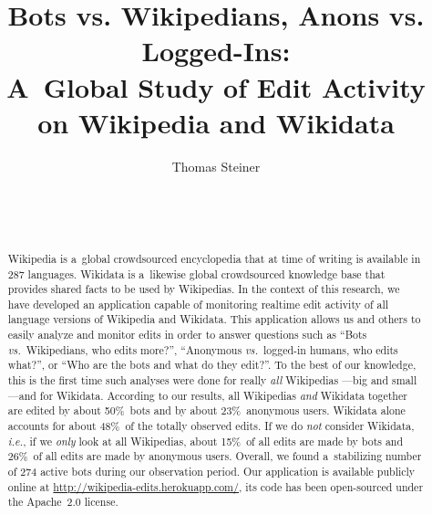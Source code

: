 \documentclass{sig-alternate}
\newcommand{\inlinelistingsize}{\fontsize{8pt}{11pt}}
\let\oldurl\url
\renewcommand{\url}[1]{\inlinelistingsize\oldurl{#1}}
\begin{document}
%

\title{Bots vs. Wikipedians, Anons vs. Logged-Ins:\\ A~Global Study of Edit Activity on Wikipedia and Wikidata}


\author{
\alignauthor
Thomas Steiner\\
       \\
       \\
       \\
}

\maketitle
\begin{abstract}
Wikipedia is a~global crowdsourced encyclopedia
that at time of writing is available in 287 languages.
Wikidata is a~likewise global crowdsourced knowledge base
that provides shared facts to be used by Wikipedias.
In the context of this research, we have developed
an application capable of monitoring
realtime edit activity of all language versions
of Wikipedia and Wikidata.
This application allows us and others to easily analyze and monitor edits
in order to answer questions such as
``Bots \emph{vs.}\ Wikipedians, who edits more?'',
``Anonymous \emph{vs.}\ logged-in humans, who edits what?'',
or ``Who are the bots and what do they edit?''.
To the best of our knowledge,
this is the first time such analyses
were done for really \emph{all} Wikipedias%
---big and small---and for Wikidata.
According to our results, all Wikipedias \emph{and} Wikidata together
are edited by about 50\%~bots and by about 23\%~anonymous users.
Wikidata alone accounts for about 48\%~of the totally observed edits.
If we do \emph{not} consider Wikidata, \emph{i.e.},
if we \emph{only} look at all Wikipedias,
about 15\%~of all edits are made by bots
and 26\%~of all edits are made by anonymous users.
Overall, we found a~stabilizing number of 274 active bots
during our observation period.
Our application is available publicly online at
\url{http://wikipedia-edits.herokuapp.com/},
its code has been open-sourced under the Apache~2.0 license.
\end{abstract}
\end{document}
